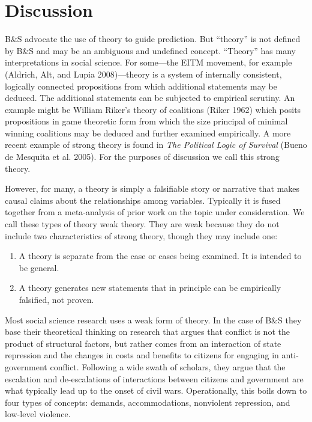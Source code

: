 \documentclass[
]{article}
\providecommand{\tightlist}{%
  \setlength{\itemsep}{0pt}\setlength{\parskip}{0pt}}
\begin{document}
\hypertarget{discussion}{%
\section{Discussion}\label{discussion}}

B\&S advocate the use of theory to guide prediction. But ``theory'' is not defined by B\&S and may be an ambiguous and undefined concept. ``Theory'' has many interpretations in social science. For some---the EITM movement, for example (Aldrich, Alt, and Lupia 2008)---theory is a system of internally consistent, logically connected propositions from which additional statements may be deduced. The additional statements can be subjected to empirical scrutiny. An example might be William Riker's theory of coalitions (Riker 1962) which posits propositions in game theoretic form from which the size principal of minimal winning coalitions may be deduced and further examined empirically. A more recent example of strong theory is found in \emph{The Political Logic of Survival} (Bueno de Mesquita et al. 2005). For the purposes of discussion we call this strong theory.

However, for many, a theory is simply a falsifiable story or narrative that makes causal claims about the relationships among variables. Typically it is fused together from a meta-analysis of prior work on the topic under consideration. We call these types of theory weak theory. They are weak because they do not include two characteristics of strong theory, though they may include one:

\begin{enumerate}
\def\labelenumi{\arabic{enumi}.}
\tightlist
\item
  A theory is separate from the case or cases being examined. It is intended to be general.
\item
  A theory generates new statements that in principle can be empirically falsified, not proven.
\end{enumerate}

Most social science research uses a weak form of theory. In the case of B\&S they base their theoretical thinking on research that argues that conflict is not the product of structural factors, but rather comes from an interaction of state repression and the changes in costs and benefits to citizens for engaging in anti-government conflict. Following a wide swath of scholars, they argue that the escalation and de-escalations of interactions between citizens and government are what typically lead up to the onset of civil wars. Operationally, this boils down to four types of concepts: demands, accommodations, nonviolent repression, and low-level violence.
\end{document}
